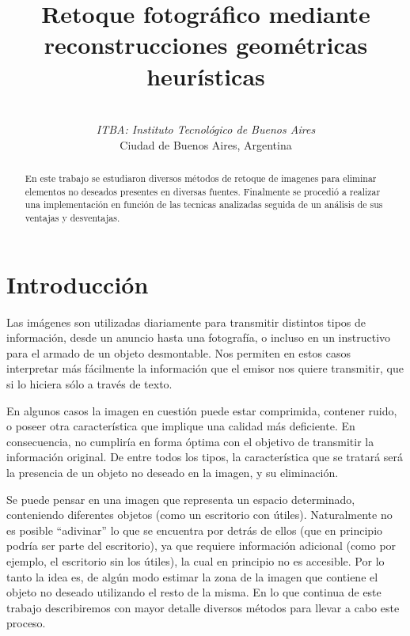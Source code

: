\documentclass[conference]{IEEEtran}
\begin{document}
\title{Retoque fotográfico mediante reconstrucciones geométricas heurísticas}
\author{
 \\
\textit{ITBA: Instituto Tecnológico de Buenos Aires}\\
Ciudad de Buenos Aires, Argentina
}
\maketitle

\begin{abstract}
En este trabajo se estudiaron
 diversos métodos de retoque de imagenes para eliminar elementos no deseados presentes en diversas fuentes. Finalmente se procedió a realizar una implementación en función de las tecnicas analizadas seguida de un análisis de sus ventajas y desventajas.
\end{abstract}

\section{Introducción}
Las imágenes son utilizadas diariamente para transmitir distintos tipos de información, desde un anuncio hasta una fotografía, o incluso en un instructivo para el armado de un objeto desmontable. Nos permiten en estos casos interpretar más fácilmente la información que el emisor nos quiere transmitir, que si lo hiciera sólo a través de texto.\par
En algunos casos la imagen en cuestión puede estar comprimida, contener ruido, o poseer otra característica que implique una calidad más deficiente. En consecuencia, no cumpliría en forma óptima con el objetivo de transmitir la información original. De entre todos los tipos, la característica que se tratará será la presencia de un objeto no deseado en la imagen, y su eliminación.\par
Se puede pensar en una imagen que representa un espacio determinado, conteniendo diferentes objetos (como un escritorio con útiles). Naturalmente no es posible ``adivinar'' lo que se encuentra por detrás de ellos (que en principio podría ser parte del escritorio), ya que requiere información adicional (como por ejemplo, el escritorio sin los útiles), la cual en principio no es accesible. Por lo tanto la idea es, de algún modo estimar la zona de la imagen que contiene el objeto no deseado utilizando el resto de la misma. En lo que continua de este trabajo describiremos con mayor detalle diversos métodos para llevar a cabo este proceso.
\end{document}

